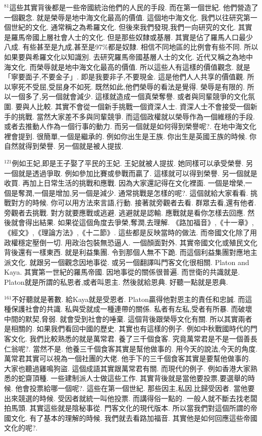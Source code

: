 \documentclass{book}
\begin{document}
$^{81}$這些其實背後都是一些帝國統治他們的人民的手段.
而在第一個世紀.
他們營造了一個觀念.
就是榮辱是地中海文化最高的價值.
這個地中海文化.
我們以往研究第一個世紀的文化.
通常稱之為希羅文化.
但後來我們發現,我們一向研究的文化.
其實是羅馬帝國上層社會人士的文化.
但是那些奴隸或基層.
其實是佔了羅馬人口最少八成.
有些甚至是九成,甚至是97\%都是奴隸.
相信不同地區的比例會有些不同.
所以如果要與希羅文化以知識別.
去研究羅馬帝國基層人士的文化.
近代又稱之為地中海文化.
而榮辱就是地中海文化最高的價值.
所以這些人有這樣的價值觀念.
就是「寧要面子,不要金子」.
即是我要非子,不要現金.
這是他們人人共享的價值觀.
所以寧死不受屈,受屈身不如死.
既然如此,他們榮辱的看法是覺得.
榮辱是有限的.
所以一個多了,另一個就會減少.
這樣就造成一個真榮奪譽.
或者與同輩競爭的文化氛圍.
要與人比較.
其實不會從一個新手挑戰一個資深人士.
資深人士不會接受一個新手的挑戰.
當然大家差不多與同輩競爭.
而這個政權就以榮辱作為一個維穩的手段.
或者去推動人作為一個行事的動力.
而另一個就是如何得到榮譽呢?.
在地中海文化裡會提到.
很簡單,一個是繼承的.
例如你出生是王族.
你出生是英國王族的時候.
你自然就得到榮譽.
另一個就是被人提拔.

$^{121}$例如王妃,即是王子娶了平民的王妃.
王妃就被人提拔.
她同樣可以承受榮譽.
另一個就是透過爭取.
例如參加比賽或參戰而贏了.
這樣就可以得到榮譽.
另一個就是收買.
再加上日常生活的挑戰和應戰.
因為大家還記得在文化裡面.
一個是增榮,一個是奪潤,一個是增加,另一個是減少.
通常挑戰是怎樣的呢?.
這個就給大家看看.
挑戰對方的時候.
你可以用方法來言語,行動.
接著就旁觀者去看.
群眾去看,還有他者.
旁觀者去挑戰.
對方就要應戰或逃避.
逃避就是認輸.
應戰就是看你怎樣去回應.
然後就會得出結果.
如果從這個角度去爭榮,奪潤,去理解.
《路加福音》,《十一章》,《經文》,《理論方法》,《十二節》.
這些都是反映當時的做法.
而帝國文化除了用政權穩定壓倒一切.
用政治包裝無恐逼人.
一個顏面對外.
其實帝國文化或殖民文化背後還有一樣東西.
就是利益集團.
令到那個人無不下跪.
而這個利益集團對應地主派文化.
就跟另一個觀念因地事從.
或另一個翻譯叫門客文化很相關.
Platon and Kaya.
其實第一世紀的羅馬帝國.
因地事從的關係很普遍.
而世衛的共識就是.
Platon就是所謂的私恩者,或者叫恩主.
然後就給恩典.
好聽一點就是恩典.

$^{161}$不好聽就是著數.
給Kaya就是受恩者.
Platon贏得他對恩主的責任和忠誠.
而這種保護社會的共識.
私與受就成一種連帶的關係.
私者有左私,受者有所暴.
而破壞中間的默契,脅弱.
就會受到社會的唾棄.
這個背後跟榮辱文化有關.
所以其實兩者是相關的.
如果我們看回中國的歷史.
其實也有這樣的例子.
例如中秋戰國時代的門客文化.
我們比較熟悉的就是萬常君.
養了三千個食客.
究竟萬常君是不是一個善長仁翁呢?.
當然不是.
他養三千個食客其實是幫他做事的.
用今天的說法,今天的角度.
萬常君其實可以視為一個社團的大佬.
他手下的三千個食客其實是要幫他做事的.
大家也聽過雞鳴狗盜.
這個成語其實跟萬常君有關.
而現代的例子.
例如香港大家熟悉的蛇齋頂種.
一些建制派人士做這些工作.
其實背後就是當他要投票,要選舉的時候.
他會投票給哪一個呢?.
這些在第一個世紀.
那些因主,私因,比歸受因者.
當他要出來競選的時候.
受因者就統一叫他投票.
而講得俗一點的.
一般人就不斷去找老闆拍馬頭.
其實這些就是陰秘事從.
門客文化的現代版本.
所以當我們對這個所謂的帝國文化.
有了基本的理解的時候.
我們就去看路加福音.
其實他是如何回應這些帝國文化的呢?.
\end{document}
